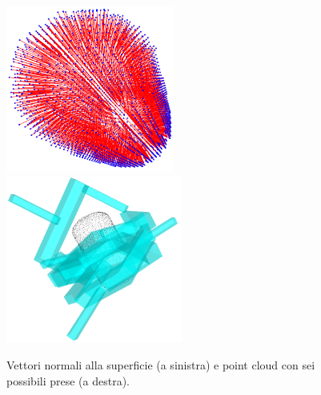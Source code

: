 \documentclass{report}
\begin{document}
\begin{figure}[h!]
	\centering
	\includegraphics[height=5.5cm]{immagini/gpg1}
	\includegraphics[height=5.5cm]{immagini/gpg2}
	\caption{Vettori normali alla superficie (a sinistra) e point cloud con sei possibili prese (a destra).}
	\label{figura:imggpg}
\end{figure}
\end{document}
